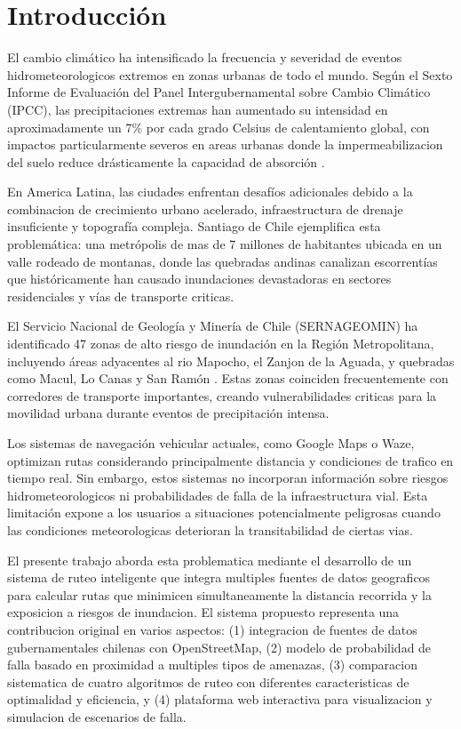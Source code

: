 \documentclass[conference]{IEEEtran}
\begin{document}
\section{Introducción}

El cambio climático ha intensificado la frecuencia y severidad de eventos hidrometeorologicos extremos en zonas urbanas de todo el mundo. Según el Sexto Informe de Evaluación del Panel Intergubernamental sobre Cambio Climático (IPCC), las precipitaciones extremas han aumentado su intensidad en aproximadamente un 7\% por cada grado Celsius de calentamiento global, con impactos particularmente severos en areas urbanas donde la impermeabilizacion del suelo reduce drásticamente la capacidad de absorción \cite{ipcc2021}.

En America Latina, las ciudades enfrentan desafíos adicionales debido a la combinacion de crecimiento urbano acelerado, infraestructura de drenaje insuficiente y topografía compleja. Santiago de Chile ejemplifica esta problemática: una metrópolis de mas de 7 millones de habitantes ubicada en un valle rodeado de montanas, donde las quebradas andinas canalizan escorrentías que históricamente han causado inundaciones devastadoras en sectores residenciales y vías de transporte criticas.

El Servicio Nacional de Geología y Minería de Chile (SERNAGEOMIN) ha identificado 47 zonas de alto riesgo de inundación en la Región Metropolitana, incluyendo áreas adyacentes al rio Mapocho, el Zanjon de la Aguada, y quebradas como Macul, Lo Canas y San Ramón \cite{sernageomin2020}. Estas zonas coinciden frecuentemente con corredores de transporte importantes, creando vulnerabilidades criticas para la movilidad urbana durante eventos de precipitación intensa.

Los sistemas de navegación vehicular actuales, como Google Maps o Waze, optimizan rutas considerando principalmente distancia y condiciones de trafico en tiempo real. Sin embargo, estos sistemas no incorporan información sobre riesgos hidrometeorologicos ni probabilidades de falla de la infraestructura vial. Esta limitación expone a los usuarios a situaciones potencialmente peligrosas cuando las condiciones meteorologicas deterioran la transitabilidad de ciertas vias.

El presente trabajo aborda esta problematica mediante el desarrollo de un sistema de ruteo inteligente que integra multiples fuentes de datos geograficos para calcular rutas que minimicen simultaneamente la distancia recorrida y la exposicion a riesgos de inundacion. El sistema propuesto representa una contribucion original en varios aspectos: (1) integracion de fuentes de datos gubernamentales chilenas con OpenStreetMap, (2) modelo de probabilidad de falla basado en proximidad a multiples tipos de amenazas, (3) comparacion sistematica de cuatro algoritmos de ruteo con diferentes caracteristicas de optimalidad y eficiencia, y (4) plataforma web interactiva para visualizacion y simulacion de escenarios de falla.
\end{document}
